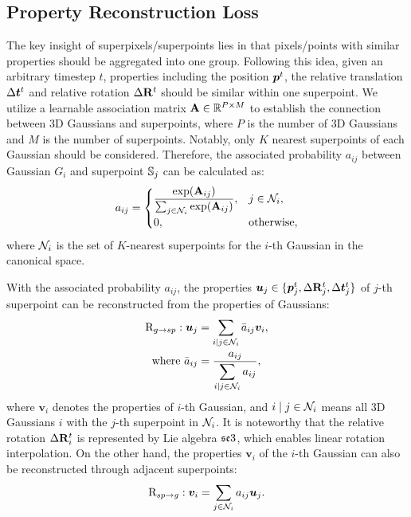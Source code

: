 \subsection{Property Reconstruction Loss} \label{sec:loss}

The key insight of superpixels/superpoints lies in that pixels/points with similar properties should be aggregated into one group.
Following this idea, given an arbitrary timestep $t$, properties including the position $\bm{p}^t$, the relative translation $\Delta\bm{t}^t$ and relative rotation $\Delta\mathbf{R}^t$ should be similar within one superpoint.
We utilize a learnable association matrix $\mathbf{A}\in \mathbb{R}^{P\times M}$ to establish the connection between 3D Gaussians and superpoints, where $P$ is the number of 3D Gaussians and $M$ is the number of superpoints.
Notably, only $K$ nearest superpoints of each Gaussian should be considered. 
Therefore, the associated probability $a_{ij}$ between Gaussian $G_i$ and superpoint $\mathbb{S}_j$ can be calculated as:
\begin{equation}
    a_{ij} = \begin{cases}
      \displaystyle  \frac{\exp(\mathbf{A}_{ij})}{\sum_{j\in \mathcal{N}_i}{\exp(\mathbf{A}_{ij})}}, & j \in \mathcal{N}_i, \\
        0, & \text{otherwise},
    \end{cases}
\end{equation}
where $\mathcal{N}_i$ is the set of $K$-nearest superpoints for the $i$-th Gaussian in the canonical space.

With the associated probability $a_{ij}$, the properties $\bm{u}_j \in \{\bm{p}^t_j, \Delta\mathbf{R}_j^t, \Delta\bm{t}_j^t\}$ of $j$-th superpoint can be reconstructed from the properties of Gaussians:
\begin{equation} \label{eq:g2sp}
\begin{split}
   \mathrm{R}_{g \to sp}: \bm{u}_j  & =\sum_{i \mid j \in \mathcal{N}_i} \bar{a}_{ij} \bm{v}_i, \\
   \mbox{where~} \bar{a}_{ij} & = \frac{a_{ij}}{\displaystyle \sum_{i \mid  j \in \mathcal{N}_i}{a_{ij}}},
\end{split}
\end{equation}
where $\bm{v}_i$ denotes the properties of $i$-th Gaussian, and ${i \mid j \in \mathcal{N}_i}$ means all 3D Gaussians $i$ with the $j$-th superpoint in $\mathcal{N}_i$.
It is noteworthy that the relative rotation $\Delta\mathbf{R}_i^t$ is represented by Lie algebra $\mathfrak{s}\mathfrak{e}3$, which enables linear rotation interpolation. 
On the other hand, the properties $\bm{v}_i$ of the $i$-th Gaussian can also be reconstructed through adjacent superpoints:
\begin{equation} \label{eq:sp2g}
   \mathrm{R}_{sp \to g}: \bm{v}_i = \sum_{j \in \mathcal{N}_i} a_{ij} \bm{u}_j.
\end{equation}


